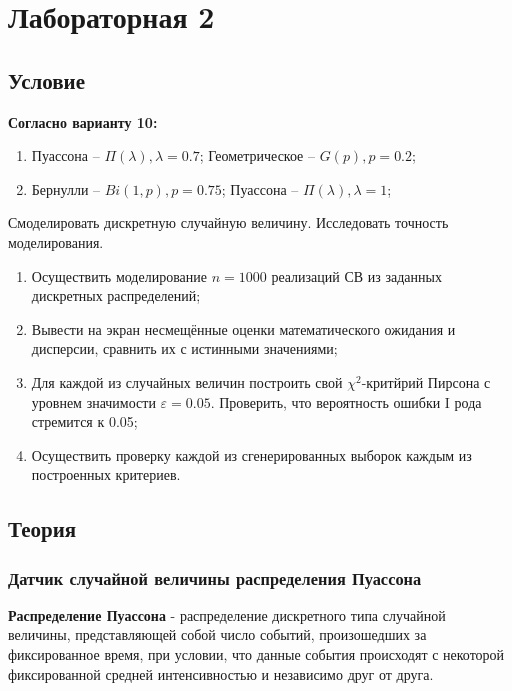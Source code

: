 \section{Лабораторная 2}

\subsection{Условие}

\textbf{Согласно варианту 10:}
\begin{enumerate}
	\item Пуассона – $\Pi(\lambda), \lambda = 0.7$; Геометрическое – $G(p), p = 0.2$;
	\item Бернулли – $Bi(1, p), p = 0.75$; Пуассона – $\Pi(\lambda), \lambda = 1$;
\end{enumerate}

Смоделировать дискретную случайную величину. Исследовать точность моделирования.

\begin{enumerate}
	\item Осуществить моделирование $n = 1000$ реализаций СВ из заданных дискретных распределений;
	\item Вывести на экран несмещённые оценки математического ожидания и дисперсии, сравнить их с истинными значениями;
	\item Для каждой из случайных величин построить свой $\chi^{2}$-критйрий Пирсона с уровнем значимости $\varepsilon = 0.05$. Проверить, что вероятность ошибки I рода стремится к 0.05;
	\item Осуществить проверку каждой из сгенерированных выборок каждым из построенных критериев.
\end{enumerate}

\subsection{Теория}
\subsubsection{Датчик случайной величины распределения Пуассона}

\textbf{Распределение Пуассона} -  распределение дискретного типа случайной величины, представляющей собой число событий, произошедших за фиксированное время, при условии, что данные события происходят с некоторой фиксированной средней интенсивностью и независимо друг от друга.\\

